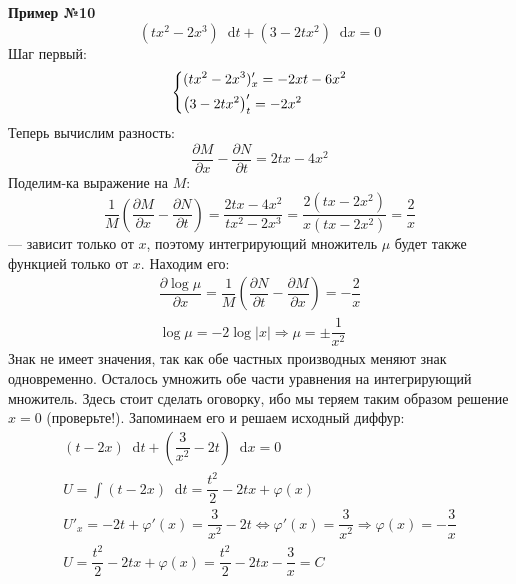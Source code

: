 \documentclass[a4paper,12pt]{article}
\renewcommand*\d{\mathop{}\!\mathrm{d}}
\newcommand{\fe}{\varphi}
\newcommand{\ds}{\displaystyle}
\begin{document}
\textbf{Пример №10}
\[(tx^2 - 2x^3)\d t + (3 - 2tx^2)\d x = 0\]
Шаг первый:
\[\left\{\begin{gathered}
(tx^2 - 2x^3)'_x = -2xt - 6x^2\hfill\\
\left(3 - 2tx^2\right)'_t = -2x^2\hfill
\end{gathered}\right.\]
Теперь вычислим разность:
\[\dfrac{\partial M}{\partial x} - \dfrac{\partial N}{\partial t} = 2tx - 4x^2\]
Поделим-ка выражение на $M$:
\[\dfrac{1}{M}\left(\dfrac{\partial M}{\partial x} - \dfrac{\partial N}{\partial t}\right) = \dfrac{2tx - 4x^2}{tx^2 - 2x^3} = \dfrac{2(tx - 2x^2)}{x(tx - 2x^2)} = \dfrac{2}{x}\] --- зависит только от $x$, поэтому интегрирующий множитель $\mu$ будет также функцией только от $x$. Находим его:
\begin{gather*}
\dfrac{\partial \log\mu}{\partial x} = \dfrac{1}{M}\left(\dfrac{\partial N}{\partial t} - \dfrac{\partial M}{\partial x}\right) = -\dfrac{2}{x}\\
\log\mu = -2\log|x| \Longrightarrow \mu = \pm \dfrac{1}{x^2}
\end{gather*}
Знак не имеет значения, так как обе частных производных меняют знак одновременно. Осталось умножить обе части уравнения на интегрирующий множитель. Здесь стоит сделать оговорку, ибо мы теряем таким образом решение $x = 0$ (проверьте!). Запоминаем его и решаем исходный диффур:
\begin{gather*}
(t - 2x)\d t + \left(\dfrac{3}{x^2} - 2t\right)\d x= 0\\
U = \ds\int (t - 2x)\d t = \dfrac{t^2}{2} - 2tx + \fe(x)\\
U'_x = -2t + \fe'(x) = \dfrac{3}{x^2} - 2t \iff \fe'(x) = \dfrac{3}{x^2} \Longrightarrow \fe(x) = -\dfrac{3}{x}\\
U = \dfrac{t^2}{2} - 2tx + \fe(x) = \dfrac{t^2}{2} - 2tx -\dfrac{3}{x} = C
\end{gather*}
\end{document}
